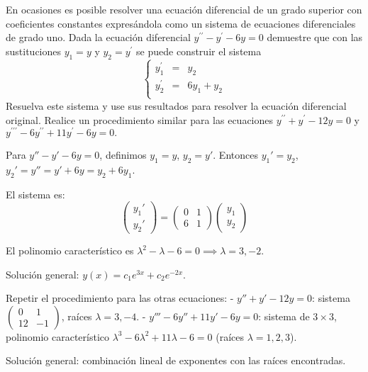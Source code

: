 \begin{prob}
En ocasiones es posible resolver una ecuación diferencial de un grado superior con coeficientes constantes expresándola como un sistema de ecuaciones diferenciales de grado uno. Dada la ecuación diferencial $y^{\prime \prime}-y^{\prime}-6y=0$ demuestre que con las sustituciones $y_{1}=y$ y $y_{2}=y^{\prime}$ se puede construir el sistema
\[
\left\lbrace \begin{matrix}
y_{1}^{\prime}&=& y_2\\
y_{2}^{\prime}&=&6y_1+y_2\\
\end{matrix} \right.
\]
Resuelva este sistema y use sus resultados para resolver la ecuación diferencial original. Realice un procedimiento similar para las ecuaciones $y^{\prime \prime}+y^{\prime}-12y=0$ y $y^{\prime \prime \prime}-6y^{\prime\prime}+11y^{\prime}-6y=0.$
\begin{myproof}
Para $y''-y'-6y=0$, definimos $y_1=y$, $y_2=y'$. Entonces $y_1'=y_2$, $y_2'=y''=y'+6y=y_2+6y_1$.

El sistema es:
\[
\begin{pmatrix} y_1' \\ y_2' \end{pmatrix} = \begin{pmatrix} 0 & 1 \\ 6 & 1 \end{pmatrix} \begin{pmatrix} y_1 \\ y_2 \end{pmatrix}
\]

El polinomio característico es $\lambda^2 - \lambda - 6 = 0 \implies \lambda=3,-2$.

Solución general: $y(x) = c_1 e^{3x} + c_2 e^{-2x}$.

Repetir el procedimiento para las otras ecuaciones:
- $y'' + y' - 12y = 0$: sistema $\begin{pmatrix} 0 & 1 \\ 12 & -1 \end{pmatrix}$, raíces $\lambda=3,-4$.
- $y''' - 6y'' + 11y' - 6y = 0$: sistema de $3\times 3$, polinomio característico $\lambda^3 - 6\lambda^2 + 11\lambda - 6 = 0$ (raíces $\lambda=1,2,3$).

Solución general: combinación lineal de exponentes con las raíces encontradas.
\end{myproof}
\end{prob}



